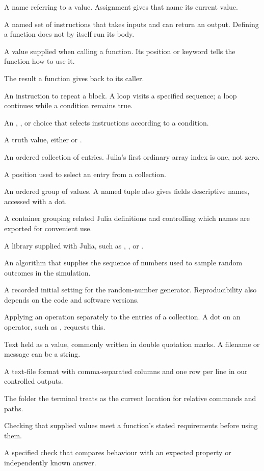 \begin{description}[style=nextline]
 \item[Variable] A name referring to a value. Assignment gives that name
       its current value.
 \item[Function] A named set of instructions that takes inputs and can
       return an output. Defining a function does not by itself run its body.
 \item[Argument] A value supplied when calling a function. Its position
       or keyword tells the function how to use it.
 \item[Return value] The result a function gives back to its caller.
 \item[Loop] An instruction to repeat a block. A  loop visits
       a specified sequence; a  loop continues while a condition
       remains true.
 \item[Conditional] An , , or  choice
       that selects instructions according to a condition.
 \item[Boolean] A truth value, either  or .
 \item[Array or vector] An ordered collection of entries. Julia's first
       ordinary array index is one, not zero.
 \item[Index] A position used to select an entry from a collection.
 \item[Tuple] An ordered group of values. A named tuple also gives fields
       descriptive names, accessed with a dot.
 \item[Module] A container grouping related Julia definitions and controlling
       which names are exported for convenient use.
 \item[Standard library] A library supplied with Julia, such as
       , , or .
 \item[Random-number generator] An algorithm that supplies the sequence of
       numbers used to sample random outcomes in the simulation.
 \item[Seed] A recorded initial setting for the random-number generator.
       Reproducibility also depends on the code and software versions.
 \item[Broadcasting] Applying an operation separately to the entries of a
       collection. A dot on an operator, such as , requests this.
 \item[String] Text held as a value, commonly written in double quotation
       marks. A filename or message can be a string.
 \item[CSV] A text-file format with comma-separated columns and one row per
       line in our controlled outputs.
 \item[Working directory] The folder the terminal treats as the current
       location for relative commands and paths.
 \item[Validation] Checking that supplied values meet a function's stated
       requirements before using them.
 \item[Test] A specified check that compares behaviour with an expected
       property or independently known answer.
\end{description}

